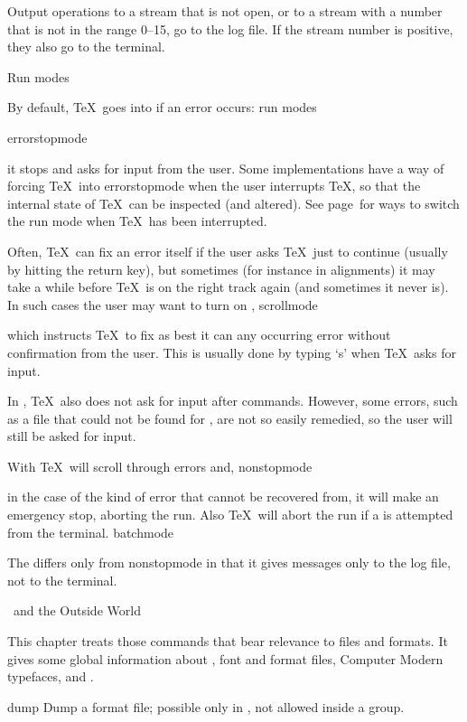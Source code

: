 Output operations to a stream that is not open, or to a
stream with a number that is not in the range 0--15,
go to the log file. If the stream number is positive,
they also go to the terminal.

\point Run modes

By default, \TeX\ goes into  if an error occurs:
\term run modes\par\csterm errorstopmode\par
it stops and asks for input from the user. Some implementations 
 have a way of forcing \TeX\ into errorstopmode
when the user interrupts \TeX, so that
the internal state of \TeX\ can be inspected (and altered). 
See page~\pgref[interaction] for ways to switch the run
mode when \TeX\ has been interrupted.

Often, \TeX\ can
fix an error itself if the user asks \TeX\ just to continue
(usually by hitting the return key),
but sometimes (for instance in alignments)
it may take a while before \TeX\ is on the
right track again (and sometimes it never is).
In such cases the user may want to
turn on ,
\csterm scrollmode\par
which instructs \TeX\ to fix as best it can any
occurring error without confirmation from the user.
This is usually done by typing `s' when \TeX\ asks
for input.

In , \TeX\ also does not ask for input
after  commands.
\alt
However, some errors, such as a file that could not be
found for , are not so easily remedied, so
the user will still be asked for input.

With  \TeX\ will scroll through errors and,
\csterm nonstopmode\par
in the case of the kind of error that cannot be recovered from,
it will make an emergency stop, aborting the run.
Also \TeX\ will abort the run if a  is attempted
from the terminal.
\csterm batchmode\par
The  differs only from nonstopmode in that
it gives messages only to the log file, not to the terminal.

\subject[TeXcomm] \TeX\ and the \nl Outside World

This
chapter treats those commands that bear relevance to
 files and formats. It gives some global information
about \IniTeX, font and format files,
Computer Modern typefaces, and \web.

\invent
\item dump 
      Dump a format file; possible only in \IniTeX, 
      not allowed inside a group.

